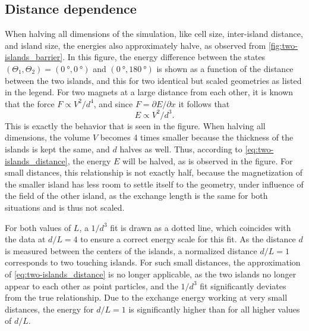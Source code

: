 \documentclass[11pt,a4paper,english,twoside]{article}
\begin{document}
\clearpage
\subsection{Distance dependence}
\label{par:TwoIslands_EnergyHeight}
When halving all dimensions of the simulation, like cell size, inter-island distance, and island size, the energies also approximately halve, as observed from \cref{fig:two-islands_barrier}. In this figure, the energy difference between the states $(\Theta_1, \Theta_2) = (\SI{0}{\degree}, \SI{0}{\degree})$ and $(\SI{0}{\degree}, \SI{180}{\degree})$ is shown as a function of the distance between the two islands, and this for two identical but scaled geometries as listed in the legend. For two magnets at a large distance from each other, it is known~\cite{MagnetForceDistance} that the force $F \propto V^2 / d^4$, and since $F=\partial E/\partial x$ it follows that
\begin{equation}
    E \propto V^2 / d^3 \mathrm{.}
    \label{eq:two-islands_distance}
\end{equation}
This is exactly the behavior that is seen in the figure. When halving all dimensions, the volume $V$ becomes 4 times smaller because the thickness of the islands is kept the same, and $d$ halves as well. Thus, according to \cref{eq:two-islands_distance}, the energy $E$ will be halved, as is observed in the figure. For small distances, this relationship is not exactly half, because the magnetization of the smaller island has less room to settle itself to the geometry, under influence of the field of the other island, as the exchange length is the same for both situations and is thus not scaled. \par
For both values of $L$, a $1/d^3$ fit is drawn as a dotted line, which coincides with the data at $d/L=4$ to ensure a correct energy scale for this fit. As the distance $d$ is measured between the centers of the islands, a normalized distance $d/L=1$ corresponds to two touching islands. For such small distances, the approximation of \cref{eq:two-islands_distance} is no longer applicable, as the two islands no longer appear to each other as point particles, and the $1/d^3$ fit significantly deviates from the true relationship. Due to the exchange energy working at very small distances, the energy for $d/L=1$ is significantly higher than for all higher values of $d/L$.
\end{document}
